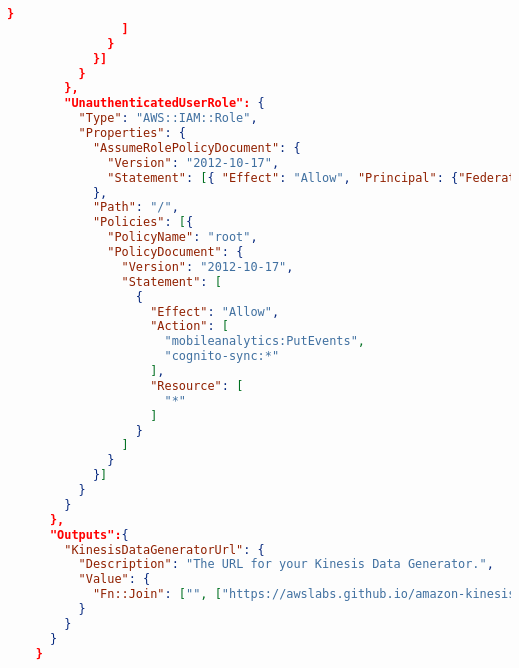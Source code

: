 \begin{lstlisting}[language=json,firstnumber=1]
                  }
                ]
              }
            }]
          }
        },
        "UnauthenticatedUserRole": {
          "Type": "AWS::IAM::Role",
          "Properties": {
            "AssumeRolePolicyDocument": {
              "Version": "2012-10-17",
              "Statement": [{ "Effect": "Allow", "Principal": {"Federated": ["cognito-identity.amazonaws.com"]}, "Action": ["sts:AssumeRoleWithWebIdentity"] }]
            },
            "Path": "/",
            "Policies": [{
              "PolicyName": "root",
              "PolicyDocument": {
                "Version": "2012-10-17",
                "Statement": [
                  {
                    "Effect": "Allow",
                    "Action": [
                      "mobileanalytics:PutEvents",
                      "cognito-sync:*"
                    ],
                    "Resource": [
                      "*"
                    ]
                  }
                ]
              }
            }]
          }
        }
      },
      "Outputs":{
        "KinesisDataGeneratorUrl": {
          "Description": "The URL for your Kinesis Data Generator.",
          "Value": {
            "Fn::Join": ["", ["https://awslabs.github.io/amazon-kinesis-data-generator/web/producer.html?", { "Fn::GetAtt": [ "SetupCognitoCustom", "Querystring" ] }]]
          }
        }
      }
    }
    \end{lstlisting}\centering\autocite{https://github.com/awslabs/amazon-kinesis-client-nodejs}
